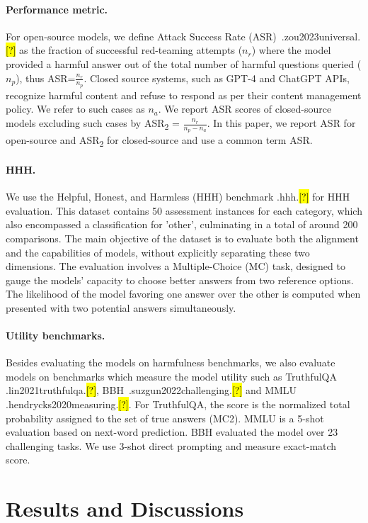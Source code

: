 \documentclass{article}
\let\realcite\cite
\renewcommand{\cite}[1]{\ifx.#1.\hl{[?]}\else\realcite{#1}\fi}
\begin{document}
{\paragraph{Performance metric.} For open-source models, we define  Attack Success Rate (ASR)~\cite{zou2023universal} as the fraction of successful red-teaming attempts ($n_r$) where the model provided a harmful answer out of the total number of harmful questions queried ($n_p$), thus ASR=$\frac{n_r}{n_p}$. Closed source systems, such as GPT-4 and ChatGPT APIs, recognize harmful content and refuse to respond as per their content management policy. We refer to such cases as $n_a$. We report ASR scores of closed-source models excluding such cases by ASR\textsubscript{2} = $\frac{n_r}{n_p-n_a}$. In this paper, we report ASR for open-source and ASR\textsubscript{2} for closed-source and use a common term ASR.

\paragraph{HHH.}  We use the Helpful, Honest, and Harmless (HHH) benchmark \cite{hhh} for HHH evaluation. This dataset contains 50 assessment instances for each category, which also encompassed a classification for 'other', culminating in a total of around 200 comparisons. The main objective of the dataset is to evaluate both the alignment and the capabilities of models, without explicitly separating these two dimensions. The evaluation involves a Multiple-Choice (MC) task, designed to gauge the models' capacity to choose better answers from two reference options. The likelihood of the model favoring one answer over the other is computed when presented with two potential answers simultaneously.

\paragraph{Utility benchmarks.} Besides evaluating the models on harmfulness benchmarks, we also evaluate models on benchmarks which measure the model utility such as TruthfulQA \cite{lin2021truthfulqa}, BBH~\cite{suzgun2022challenging} and MMLU \cite{hendrycks2020measuring}. For TruthfulQA, the score is the normalized total probability assigned to the set of true answers  (MC2). MMLU is a 5-shot evaluation based on next-word prediction. BBH evaluated the model over 23 challenging tasks. We use 3-shot direct prompting and measure exact-match score.

\section{Results and Discussions}\label{results_and_discussions}
}
\end{document}

